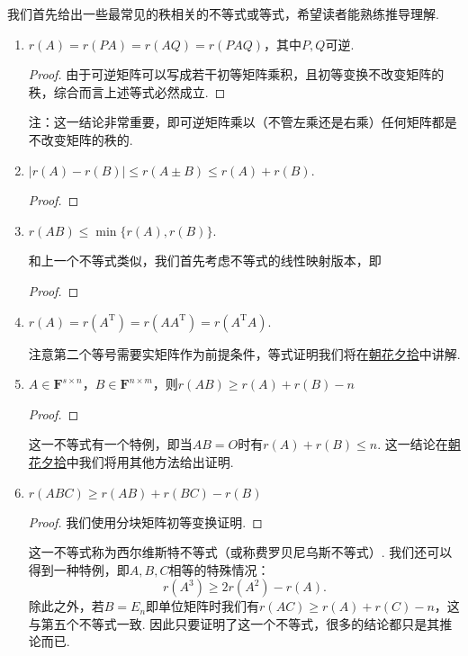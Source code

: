 我们首先给出一些最常见的秩相关的不等式或等式，希望读者能熟练推导理解.
\begin{enumerate}
    \item $r(A)=r(PA)=r(AQ)=r(PAQ)$，其中$P,Q$可逆.

          \begin{proof}
              由于可逆矩阵可以写成若干初等矩阵乘积，且初等变换不改变矩阵的秩，综合而言上述等式必然成立.
          \end{proof}

          注：这一结论非常重要，即可逆矩阵乘以（不管左乘还是右乘）任何矩阵都是不改变矩阵的秩的.

    \item $|r(A)-r(B)|\leqslant r(A\pm B) \leqslant r(A)+r(B)$.

          \begin{proof}

          \end{proof}

    \item $r(AB) \leqslant \min\{r(A), r(B)\}$.

          和上一个不等式类似，我们首先考虑不等式的线性映射版本，即

          \begin{proof}

          \end{proof}

    \item $r(A)=r(A^\mathrm{T})=r(AA^\mathrm{T})=r(A^\mathrm{T}A)$.

          注意第二个等号需要实矩阵作为前提条件，等式证明我们将在\hyperref[chap:朝花夕拾]{朝花夕拾}中讲解.

    \item $A \in \mathbf{F}^{s \times n}$，$B \in \mathbf{F}^{n \times m}$，则$r(AB) \geqslant r(A)+r(B)-n$

          \begin{proof}

          \end{proof}

          这一不等式有一个特例，即当$AB=O$时有$r(A)+r(B)\leqslant n$. 这一结论在\hyperref[chap:朝花夕拾]{朝花夕拾}中我们将用其他方法给出证明.

    \item $r(ABC) \geqslant r(AB)+r(BC)-r(B)$

          \begin{proof}
              我们使用分块矩阵初等变换证明.
          \end{proof}

          这一不等式称为西尔维斯特不等式（或称费罗贝尼乌斯不等式）. 我们还可以得到一种特例，即$A,B,C$相等的特殊情况：
          \[r(A^3) \geqslant 2r(A^2)-r(A).\]
          除此之外，若$B=E_n$即单位矩阵时我们有$r(AC) \geqslant r(A)+r(C)-n$，这与第五个不等式一致. 因此只要证明了这一个不等式，很多的结论都只是其推论而已.
\end{enumerate}

